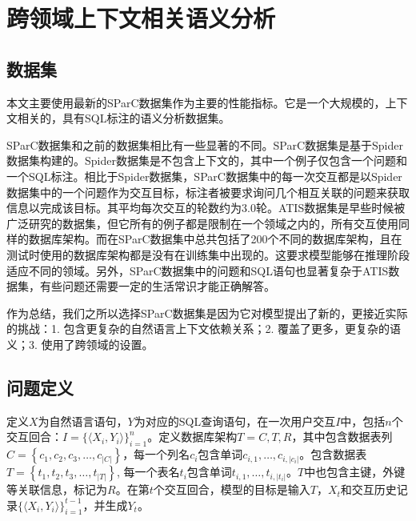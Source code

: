 \chapter{跨领域上下文相关语义分析}

\section{数据集}

本文主要使用最新的SParC\cite{sparc19}数据集作为主要的性能指标。它是一个大规模的，上下文相关的，具有SQL标注的语义分析数据集。

SParC数据集和之前的数据集相比有一些显著的不同。SParC数据集是基于Spider\cite{spider18}数据集构建的。Spider数据集是不包含上下文的，其中一个例子仅包含一个问题和一个SQL标注。相比于Spider数据集，SParC数据集中的每一次交互都是以Spider数据集中的一个问题作为交互目标，标注者被要求询问几个相互关联的问题来获取信息以完成该目标。其平均每次交互的轮数约为3.0轮。ATIS数据集是早些时候被广泛研究的数据集，但它所有的例子都是限制在一个领域之内的，所有交互使用同样的数据库架构。而在SParC数据集中总共包括了200个不同的数据库架构，且在测试时使用的数据库架构都是没有在训练集中出现的。这要求模型能够在推理阶段适应不同的领域。另外，SParC数据集中的问题和SQL语句也显著复杂于ATIS数据集，有些问题还需要一定的生活常识才能正确解答。

作为总结，我们之所以选择SParC数据集是因为它对模型提出了新的，更接近实际的挑战：1. 包含更复杂的自然语言上下文依赖关系；2. 覆盖了更多，更复杂的语义；3. 使用了跨领域的设置。

\section{问题定义}

定义$X$为自然语言语句，$Y$为对应的SQL查询语句，在一次用户交互$I$中，包括$n$个交互回合：$I=\{\langle X_i,Y_i\rangle\}_{i=1}^n$。定义数据库架构$T=C,T,R$，其中包含数据表列$C=\left\{c_1,c_2,c_3,\ldots,c_{\left|C\right|}\right\}$，每一个列名$c_i$包含单词$c_{i,1},\ldots,c_{i,\left|c_i\right|}$。包含数据表$T=\left\{t_1,t_2,t_3,\ldots,t_{\left|T\right|}\right\}$, 每一个表名$t_i$包含单词$t_{i,1},\ldots,t_{i,\left|t_i\right|}$。$T$中也包含主键，外键等关联信息，标记为$R$。在第$t$个交互回合，模型的目标是输入$T$，$X_t$和交互历史记录$\{\langle X_i,Y_i\rangle\}_{i=1}^{t-1}$，并生成$Y_t$。
